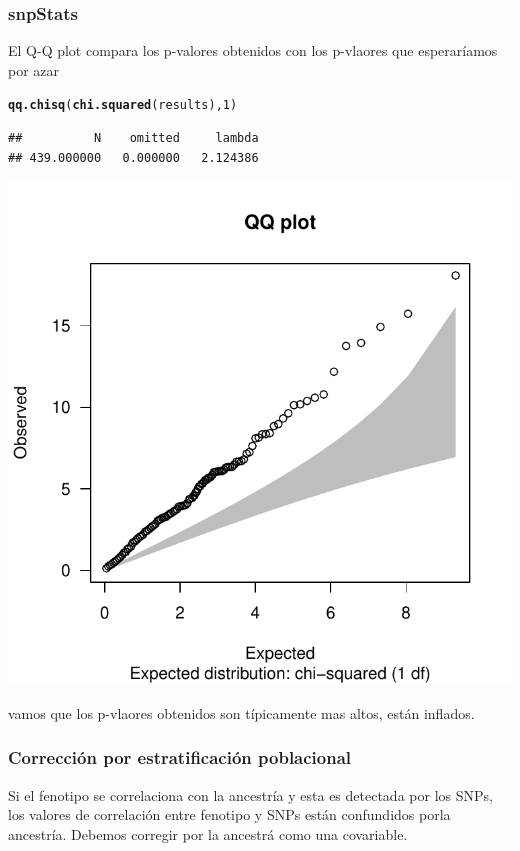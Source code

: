 \documentclass{beamer}\usepackage[]{graphicx}\usepackage[]{color}
\makeatletter
\newcommand{\hlnum}[1]{\textcolor[rgb]{0.686,0.059,0.569}{#1}}%
\newcommand{\hlstd}[1]{\textcolor[rgb]{0.345,0.345,0.345}{#1}}%
\newcommand{\hlkwd}[1]{\textcolor[rgb]{0.737,0.353,0.396}{\textbf{#1}}}%
\newenvironment{kframe}{%
 \def\at@end@of@kframe{}%
 \ifinner\ifhmode%
  \def\at@end@of@kframe{\end{minipage}}%
  \begin{minipage}{\columnwidth}%
 \fi\fi%
 \def\FrameCommand##1{\hskip\@totalleftmargin \hskip-\fboxsep
 \colorbox{shadecolor}{##1}\hskip-\fboxsep
     \hskip-\linewidth \hskip-\@totalleftmargin \hskip\columnwidth}%
 \MakeFramed {\advance\hsize-\width
   \@totalleftmargin\z@ \linewidth\hsize
   \@setminipage}}%
 {\par\unskip\endMakeFramed%
 \at@end@of@kframe}
\newenvironment{knitrout}{}{} %
\makeatother
\begin{document}
\begin{frame}[fragile]
\frametitle{snpStats}

El Q-Q plot compara los p-valores obtenidos con los p-vlaores que esperar\'iamos por azar
\begin{knitrout}\footnotesize
{}\color{fgcolor}\begin{kframe}
\begin{alltt}
\hlkwd{qq.chisq}\hlstd{(}\hlkwd{chi.squared}\hlstd{(results),} \hlnum{1}\hlstd{)}
\end{alltt}
\begin{verbatim}
##          N    omitted     lambda 
## 439.000000   0.000000   2.124386
\end{verbatim}
\end{kframe}
\includegraphics[width=.45\linewidth]{figure/plot1-1} 

\end{knitrout}
vamos que los p-vlaores obtenidos son t\'ipicamente mas altos, est\'an inflados.
\end{frame}

\begin{frame}[fragile]
\frametitle{Correcci\'on por estratificaci\'on poblacional}
Si el fenotipo se correlaciona con la ancestr\'ia y esta es detectada por los SNPs, los valores de correlaci\'on entre fenotipo y SNPs est\'an confundidos porla ancestr\'ia. Debemos corregir por la ancestr\'a como una covariable.   

\end{frame}
\end{document}
